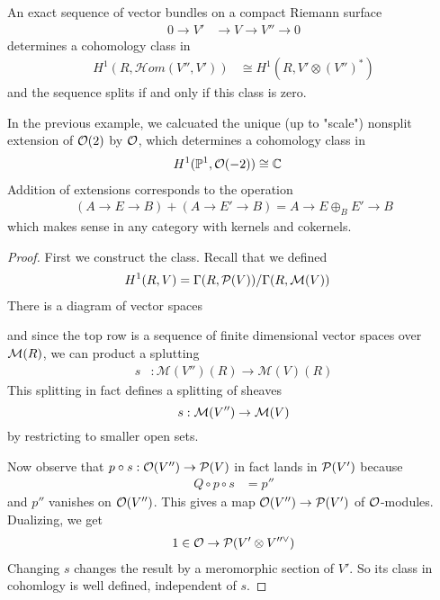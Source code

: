 \documentclass[12pt]{article}
\begin{document}
\begin{theorem}
An exact sequence of vector bundles on a compact Riemann surface
\begin{align*}
    0 \to V' & \to V \to V'' \to 0
\end{align*} determines a cohomology class in
\begin{align*}
     H^1(R, \mathcal{H}om(V'', V')) & \cong H^1(R, V' \otimes (V'')^*)
    \end{align*} and the sequence splits if and only if this class is zero.
\end{theorem}
\begin{example}
    In the previous example, we calcuated the unique (up to "scale") nonsplit extension of ${\mathcal{O}}(2)$ by ${\mathcal{O}}$, which determines a cohomology class in \begin{align*}
        H^1(\mathbb{P}^1, {\mathcal{O}}(-2)) & \cong \mathbb{C}
    \end{align*}
    Addition of extensions corresponds to the operation \begin{align*}
        (A \to E \to B) + (A \to E' \to B) = A \to E \oplus_B E' \to B
    \end{align*} which makes sense in any category with kernels and cokernels. 
\end{example}

\begin{proof}
First we construct the class. Recall that we defined \begin{align*}
    H^1(R, V) & = \Gamma(R, {\mathcal{P}}(V)) / \Gamma(R, {\mathcal{M}}(V))
\end{align*} There is a diagram of vector spaces 
\begin{center}
\end{center}
and since the top row is a sequence of finite dimensional vector spaces over ${\mathcal{M}}(R)$, we can product a splutting \begin{align*}
    s & : \mathcal{M}(V'')(R) \to \mathcal{M}(V)(R)
\end{align*} This splitting in fact defines a splitting of sheaves \[s:{\mathcal{M}}(V'') \to {\mathcal{M}}(V)\] by restricting to smaller open sets. 

Now observe that $p\circ s:{\mathcal{O}}(V'') \to {\mathcal{P}}(V)$ in fact lands in ${\mathcal{P}}(V')$ because \begin{align*}
    Q \circ p \circ s & = p'' 
\end{align*} and $p''$ vanishes on ${\mathcal{O}}(V'')$. This gives a map ${\mathcal{O}}(V'') \to {\mathcal{P}}(V')$ of ${\mathcal{O}}$-modules. Dualizing, we get \begin{align*}
    1 \in {\mathcal{O}} \to {\mathcal{P}}(V' \otimes V''^\vee)
\end{align*}
Changing $s$ changes the result by a meromorphic section of $V'$. So its class in cohomlogy is well defined, independent of $s$.
\end{proof}
\end{document}
